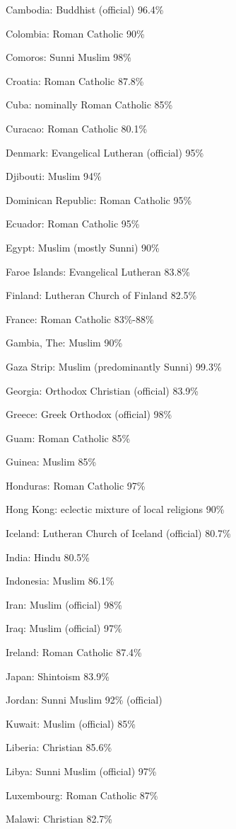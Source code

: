 \documentclass[letterpaper]{article}
\begin{document}
\begin{enumerate}
Cambodia: Buddhist (official) 96.4\%

Colombia: Roman Catholic 90\%

Comoros: Sunni Muslim 98\%

Croatia: Roman Catholic 87.8\%

Cuba: nominally Roman Catholic 85\%

Curacao: Roman Catholic 80.1\%

Denmark: Evangelical Lutheran (official) 95\%

Djibouti: Muslim 94\%

Dominican Republic: Roman Catholic 95\%

Ecuador: Roman Catholic 95\%

Egypt: Muslim (mostly Sunni) 90\%

Faroe Islands: Evangelical Lutheran 83.8\%

Finland: Lutheran Church of Finland 82.5\%

France: Roman Catholic 83\%-88\%

Gambia, The: Muslim 90\%

Gaza Strip: Muslim (predominantly Sunni) 99.3\%

Georgia: Orthodox Christian (official) 83.9\%

Greece: Greek Orthodox (official) 98\%

Guam: Roman Catholic 85\%

Guinea: Muslim 85\%

Honduras: Roman Catholic 97\%

Hong Kong: eclectic mixture of local religions 90\%

Iceland: Lutheran Church of Iceland (official) 80.7\%

India: Hindu 80.5\%

Indonesia: Muslim 86.1\%

Iran: Muslim (official) 98\%

Iraq: Muslim (official) 97\%

Ireland: Roman Catholic 87.4\%

Japan: Shintoism 83.9\%

Jordan: Sunni Muslim 92\% (official)

Kuwait: Muslim (official) 85\%

Liberia: Christian 85.6\%

Libya: Sunni Muslim (official) 97\%

Luxembourg: Roman Catholic 87\%

Malawi: Christian 82.7\%


\end{enumerate}
\end{document}
